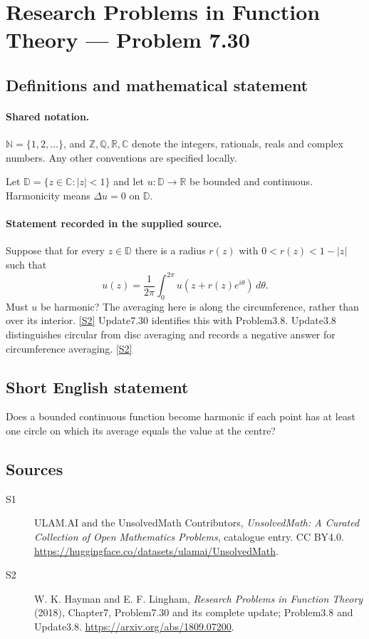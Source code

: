 \documentclass[11pt]{article}
\newcommand{\sref}[2]{\hyperlink{source:#1:#2}{[S#2]}}
\begin{document}
\section{Research Problems in Function Theory — Problem 7.30}\label{statement}

\subsection{Definitions and mathematical statement}

\paragraph{Shared notation.}$\mathbb N=\{1,2,\ldots\}$, and $\mathbb Z,\mathbb Q,\mathbb R,\mathbb C$ denote the integers, rationals, reals and complex numbers. Any other conventions are specified locally.


Let $\mathbb D=\{z\in\mathbb C:|z|<1\}$ and let $u:\mathbb D\to\mathbb R$ be bounded and continuous. Harmonicity means $\Delta u=0$ on $\mathbb D$.

\paragraph{Statement recorded in the supplied source.}
Suppose that for every $z\in\mathbb D$ there is a radius $r(z)$ with $0<r(z)<1-|z|$ such that
\[u(z)=\frac1{2\pi}\int_0^{2\pi}u(z+r(z)e^{i\theta})\,d\theta.\]
Must $u$ be harmonic? The averaging here is along the circumference, rather than over its interior. \sref{statement}{2}
Update7.30 identifies this with Problem3.8. Update3.8 distinguishes circular from disc averaging and records a negative answer for circumference averaging. \sref{statement}{2}
\subsection{Short English statement}
Does a bounded continuous function become harmonic if each point has at least one circle on which its average equals the value at the centre?
\subsection{Sources}
\begin{description}
\item[\hypertarget{source:statement:1}{S1}] ULAM.AI and the UnsolvedMath Contributors, \emph{UnsolvedMath: A Curated Collection of Open Mathematics Problems}, catalogue entry. CC BY4.0. \url{https://huggingface.co/datasets/ulamai/UnsolvedMath}.
\item[\hypertarget{source:statement:2}{S2}] W. K. Hayman and E. F. Lingham, \emph{Research Problems in Function Theory} (2018), Chapter7, Problem7.30 and its complete update; Problem3.8 and Update3.8. \url{https://arxiv.org/abs/1809.07200}.
\end{description}
\label{end:statement}
\end{document}
